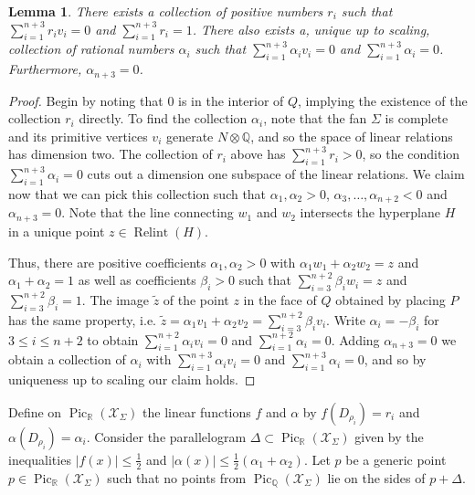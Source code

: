 \documentclass[reqno, 12pt]{amsart}
\newtheorem{lemma}[theorem]{Lemma}
\theoremstyle{definition}
\numberwithin{equation}{section}
\newcommand{\R}{\mathbb{R}}
\newcommand{\Q}{\mathbb{Q}}
\begin{document}
\begin{lemma}
    \label{Lem:collectionsrandalpha}
    There exists a collection of positive numbers $r_i$ such that $\sum_{i=1}^{n+3}r_i v_i=0$ and $\sum_{i=1}^{n+3}r_i=1$. There also exists a, unique up to scaling, collection of rational numbers $\alpha_i$ such that $\sum_{i=1}^{n+3}\alpha_i v_i=0$ and $\sum_{i=1}^{n+3}\alpha_i=0$. Furthermore, $\alpha_{n+3}=0$. 
\end{lemma}
\begin{proof}
Begin by noting that $0$ is in the interior of $Q$, implying the existence of the collection $r_i$ directly. 
To find the collection $\alpha_i$, note that the fan $\Sigma$ is complete and its primitive vertices $v_i$ generate $N\otimes \Q$, and so the space of linear relations has dimension two. The collection of $r_i$ above has $\sum_{i=1}^{n+3}r_i>0$, so the condition $\sum_{i=1}^{n+3}\alpha_i=0$ cuts out a dimension one subspace of the linear relations. We claim now that we can pick this collection such that $\alpha_1,\alpha_2>0$, $\alpha_3,\dots,\alpha_{n+2}<0$ and $\alpha_{n+3}=0$. Note that the line connecting $w_1$ and $w_2$ intersects the hyperplane $H$ in a unique point $z\in \operatorname{Relint}(H)$.

Thus, there are positive coefficients $\alpha_1, \alpha_2>0$ with $\alpha_1w_1+\alpha_2 w_2=z$ and $\alpha_1+\alpha_2=1$ as well as coefficients $\beta_i>0$ such that $\sum_{i=3}^{n+2}\beta_i w_i=z$ and $\sum_{i=3}^{n+2}\beta_i=1$. The image $\tilde{z}$ of the point $z$ in the face of $Q$ obtained by placing $P$ has the same property, i.e. $\tilde{z}=\alpha_1 v_1+\alpha_2 v_2=\sum_{i=3}^{n+2}\beta_i v_i$. Write $\alpha_i=-\beta_i$ for $3\le i\le n+2$ to obtain $\sum_{i=1}^{n+2}\alpha_i v_i=0$ and $\sum_{i=1}^{n+2}\alpha_i=0$. Adding $\alpha_{n+3}=0$ we obtain a collection of $\alpha_i$ with $\sum_{i=1}^{n+3}\alpha_i v_i=0$ and $\sum_{i=1}^{n+3}\alpha_i=0$, and so by uniqueness up to scaling our claim holds.
\end{proof}

Define on $\operatorname{Pic}_\R(\mathcal{X}_{\Sigma})$ the linear functions $f$ and $\alpha$ by $f(D_{\rho_i})=r_i$ and $\alpha(D_{\rho_i})=\alpha_i$. Consider the parallelogram $\Delta\subset \operatorname{Pic}_\R(\mathcal{X}_\Sigma)$ given by the inequalities $|f(x)|\le \frac{1}{2}$ and $|\alpha(x)|\le \frac{1}{2}(\alpha_1+\alpha_2)$. Let $p$ be a generic point $p\in \operatorname{Pic}_\R(\mathcal{X}_\Sigma)$ such that no points from $\operatorname{Pic}_\Q(\mathcal{X}_\Sigma)$ lie on the sides of $p+\Delta$.
\end{document}
